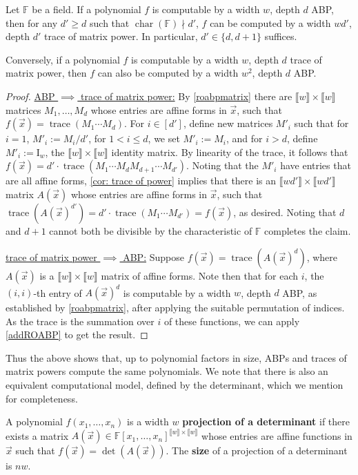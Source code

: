 \documentclass[letterpaper,11pt]{article}
\numberwithin{equation}{section}
\theoremstyle{plain}
\theoremstyle{remark}
\newcommand{\zr}[1]{{\llbracket {#1}\rrbracket}}
\DeclareMathOperator{\chara}{char}
\DeclareMathOperator{\tr}{trace}
\DeclareMathOperator{\Tr}{trace}
\newcommand{\F}{\mathbb{F}}
\newcommand{\Id}{\mathrm{I}}
\newcommand{\eqdef}{:=}
\begin{document}
\begin{theorem}\label{thm:ABP STIT}
	Let $\F$ be a field. If a polynomial $f$ is computable by a width $w$, depth $d$ ABP, then for any $d'\ge d$ such that $\chara(\F)\nmid d'$, $f$ can be computed by a width $wd'$, depth $d'$ trace of matrix power. In particular, $d'\in\{d,d+1\}$ suffices.
	
	Conversely, if a polynomial $f$ is computable by a width $w$, depth $d$ trace of matrix power, then $f$ can also be computed by a width $w^2$, depth $d$ ABP.
\end{theorem}
\begin{proof}
	\underline{ABP $\implies$ trace of matrix power:} By \autoref{roabpmatrix} there are $\zr{w}\times\zr{w}$ matrices $M_1,\ldots,M_d$ whose entries are affine forms in $\vec{x}$, such that $f(\vec{x})=\tr(M_1\cdots M_d)$.  For $i\in[d']$, define new matrices $M'_i$ such that for $i=1$,  $M'_i\eqdef M_i/d'$,  for $1<i\le d$, we set $M'_i\eqdef M_i$, and for $i>d$, define $M'_i\eqdef \Id_w$, the $\zr{w}\times\zr{w}$ identity matrix. By linearity of the trace, it follows that $f(\vec{x})=d'\cdot \tr(M_1\cdots M_d M_{d+1}\cdots M_{d'})$. Noting that the $M'_i$ have entries that are all affine forms, \autoref{cor: trace of power} implies that there is an $\zr{wd'}\times \zr{wd'}$ matrix $A(\vec{x})$ whose entries are affine forms in $\vec{x}$, such that $\Tr(A(\vec{x})^{d'})=d'\cdot \Tr(M_1\cdots M_{d'}) = f(\vec{x})$, as desired.  Noting that $d$ and $d+1$ cannot both be divisible by the characteristic of $\F$ completes the claim.
	
	
	\underline{trace of matrix power $\implies$ ABP:}  Suppose $f(\vec{x})=\tr(A(\vec{x})^d)$, where $A(\vec{x})$ is a $\zr{w}\times\zr{w}$ matrix of affine forms.  Note then that for each $i$, the $(i,i)$-th entry of $A(\vec{x})^d$ is computable by a width $w$, depth $d$ ABP, as established by \autoref{roabpmatrix}, after applying the suitable permutation of indices.  As the trace is the summation over $i$ of these functions, we can apply \autoref{addROABP} to get the result.
\end{proof}

Thus the above shows that, up to polynomial factors in size, ABPs and traces of matrix powers compute the same polynomials.  We note that there is also an equivalent computational model, defined by the determinant, which we mention for completeness.

\begin{definition}
	A polynomial $f(x_1,\ldots,x_n)$ is a width $w$ \textbf{projection of a determinant} if there exists a matrix $A(\vec{x})\in\F[x_1,\ldots,x_n]^{\zr{w}\times\zr{w}}$ whose entries are affine functions in $\vec{x}$ such that $f(\vec{x})=\det(A(\vec{x}))$. The \textbf{size} of a projection of a determinant is $nw$.
\end{definition}
\end{document}
